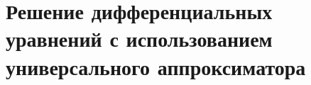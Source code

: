 \chapter*{Решение дифференциальных уравнений с использованием универсального аппроксиматора}






% 
% 


% 
% 
% 

% 
% 